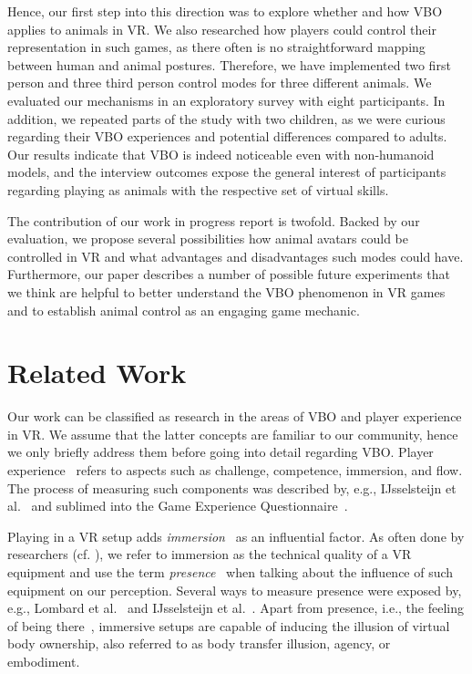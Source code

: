 \documentclass{sigchi-ext}
\begin{document}
Hence, our first step into this direction was to explore whether and how VBO applies to animals in VR. We also researched how players could control their representation in such games, as there often is no straightforward mapping between human and animal postures. Therefore, we have implemented two first person and three third person control modes for three different animals. We evaluated our mechanisms in an exploratory survey with eight participants. In addition, we repeated parts of the study with two children, as we were curious regarding their VBO experiences and potential differences compared to adults. Our results indicate that VBO is indeed noticeable even with non-humanoid models, and the interview outcomes expose the general interest of participants regarding playing as animals with the respective set of virtual skills.

The contribution of our work in progress report is twofold. Backed by our evaluation, we propose several possibilities how animal avatars could be controlled in VR and what advantages and disadvantages such modes could have. Furthermore, our paper describes a number of possible future experiments that we think are helpful to better understand the VBO phenomenon in VR games and to establish animal control as an engaging game mechanic.



\section{Related Work}

Our work can be classified as research in the areas of VBO and player experience in VR. We assume that the latter concepts are familiar to our community, hence we only briefly address them before going into detail regarding VBO. Player experience~\cite{Wiemeyer.2016} refers to aspects such as challenge, competence, immersion, and flow. The process of measuring such components was described by, e.g., IJsselsteijn et al.~\cite{ijsselsteijn2007characterising, ijsselsteijn2008measuring} and sublimed into the Game Experience Questionnaire~\cite{IJsselsteijn.2013}. 

Playing in a VR setup adds \textit{immersion}~\cite{cairns2014immersion} as an influential factor. As often done by researchers (cf. \cite{Biocca:1995:IVR:207922.207926, sherman2002understanding}), we refer to immersion as the technical quality of a VR equipment and use the term \textit{presence}~\cite{slater1995taking, slater2003note} when talking about the influence of such equipment on our perception. Several ways to measure presence were exposed by, e.g., Lombard et al.~\cite{lombard1997heart} and IJsselsteijn et al.~\cite{IJsselsteijn}. Apart from presence, i.e., the feeling of being there~\cite{heeter1992being}, immersive setups are capable of inducing the illusion of virtual body ownership, also referred to as body transfer illusion, agency, or embodiment.
\end{document}
